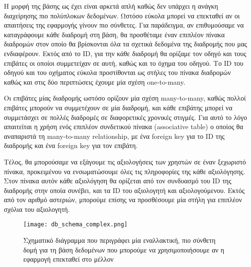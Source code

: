 \documentclass[../thesis.tex]{subfiles}
\begin{document}
\bigskip

Η μορφή της βάσης ως έχει είναι αρκετά απλή καθώς δεν υπάρχει η ανάγκη διαχείρησης πιο πολύπλοκων δεδομένων.
Ωστόσο εύκολα μπορεί να επεκταθεί αν οι απαιτήσεις της εφαρμογής γίνουν πιο σύνθετες.
Για παράδειγμα, αν επιθυμούσαμε να καταγράφουμε κάθε διαδρομή στη βάση, θα προσθέταμε έναν επιπλέον πίνακα διαδρομών στον οποίο θα βρίσκονται όλα τα σχετικά δεδομένα της διαδρομής που μας ενδιαφέρουν.
Εκτός από το ID, για την κάθε διαδρομή θα ορίζαμε τον οδηγό και τους επιβάτες οι οποίοι συμμετείχαν σε αυτή, καθώς και το όχημα του οδηγού.
Το ID του οδηγού και του οχήματος εύκολα προστίθονται ως στήλες του πίνακα διαδρομών καθώς και στις δύο περιπτώσεις έχουμε μία σχέση one-to-many.

Οι επιβάτες μίας διαδρομής ωστόσο ορίζουν μία σχέση many-to-many, καθώς πολλοί επιβάτες μπορούν να συμμετέχουν σε μία διαδρομή, και κάθε επιβάτης μπορεί να συμμετάσχει σε πολλές διαδρομές σε διαφορετικές χρονικές στιγμές.
Για αυτό το λόγο απαιτείται η χρήση ενός επιπλέον συνδετικού πίνακα (associative table) ο οποίος θα αναπαριστά τη many-to-many relationship, με ένα foreign key για το ID της διαδρομής και ένα foreign key για τον επιβάτη.

Τέλος, θα μπορούσαμε να εξάγουμε τις αξιολογήσεις των χρηστών σε έναν ξεχωριστό πίνακα, προκειμένου να ενσωματώσουμε όλες τις πληροφορίες της κάθε αξιολόγησης.
Στον πίνακα αυτόν κάθε αξιολόγηση θα ορίζεται από τον συνδυασμό του ID της διαδρομής στην οποία συνέβει, και τα ID του αξιολογητή και αξιολογούμενου.
Εκτός από τον αριθμό αστεριών, μπορούμε επίσης να προσθέσουμε μία στήλη για επιπλέον σχόλια του αξιολογητή.

\begin{figure}
    \texttt{[image: db\_schema\_complex.png]}
    \centering
    \caption{Σχηματικό διάγραμμα που περιγράφει μία εναλλακτική, πιο σύνθετη δομή για τη βάση δεδομένων που μπορούμε να χρησιμοποιήσουμε αν η εφαρμογή επεκταθεί στο μέλλον}
\end{figure}
\end{document}
